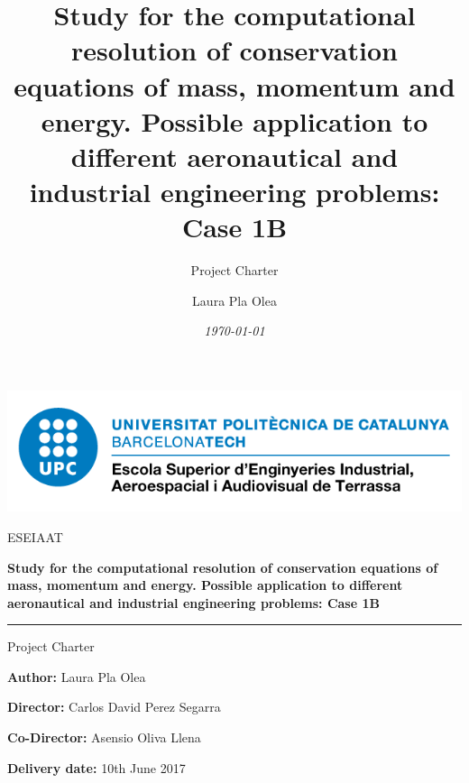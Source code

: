 \documentclass[12pt, titlepage]{scrartcl}
\title{Study for the computational resolution of conservation equations of mass, momentum and energy. Possible application to different aeronautical and industrial engineering problems: Case 1B}
\subtitle{Project Charter \vspace{7cm}}
\author{Laura Pla Olea}
\date{\textit{\today}}
\begin{document}
\begin{titlepage}
	\thispagestyle{titlepage}
	\begin{center}
	\includegraphics[scale=0.5]{image}\par
	\vspace{1cm}
	{\scshape\Large ESEIAAT \par}
	\vspace{1cm}
	{\huge\bfseries Study for the computational resolution of conservation equations of mass, momentum and energy. Possible application to different aeronautical and industrial engineering problems: Case 1B\par}
	\textcolor{cyan}{\rule{\textwidth}{.6pt}}
	\vspace{2cm}
	{\Large Project Charter\par}
	\vfill
	\end{center}
	
	\vspace{10pt}
	\textbf{Author:} Laura Pla Olea
	
	\textbf{Director:} Carlos David Perez Segarra
	
	\textbf{Co-Director:} Asensio Oliva Llena
	
	\textbf{Delivery date:} 10th June 2017
	\vspace{10pt}

\end{titlepage}
\tableofcontents
\pagebreak
\pagebreak











\end{document}
